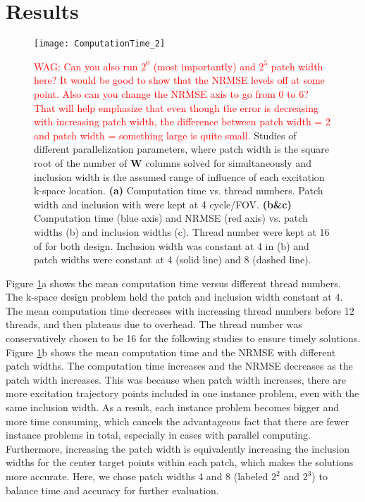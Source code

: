 \section*{Results}

\begin{figure}
	\centering
	\texttt{[image: ComputationTime\_2]}
	\caption{\textcolor{red}{WAG: Can you also run $2^0$ (most importantly) and $2^5$ patch width here? It would be good to show that the NRMSE levels off at some point. Also can you change the NRMSE axis to go from 0 to 6? That will help emphasize that even though the error is decreasing with increasing patch width, 
	the difference between patch width = 2 and patch width = something large is quite small. }
	Studies of different parallelization parameters, where patch width is the square root of the number of $\mathbf{W}$ columns solved for simultaneously and inclusion width is the assumed range of influence of each excitation k-space location. \textbf{(a)} Computation time vs. thread numbers. Patch width and inclusion with were kept at 4 cycle/FOV. \textbf{(b\&c)} Computation time (blue axis) and NRMSE (red axis) vs. patch widths (b) and inclusion widths (c). Thread number were kept at 16 of for both design. Inclusion width was constant at 4 in (b) and patch widths were constant at 4 (solid line) and 8 (dashed line).}
	\label{fig:ComputationTime}
\end{figure}
Figure \ref{fig:ComputationTime}a shows the mean computation time versus different thread numbers. The k-space design problem held the patch and inclusion width constant at 4. The mean computation time decreases with increasing thread numbers before 12 threads, and then plateaus due to overhead. The thread number was conservatively chosen to be 16 for the following studies to ensure timely solutions. 
Figure \ref{fig:ComputationTime}b shows the mean computation time and the NRMSE with different patch widths. The computation time increases and the NRMSE decreases as the patch width increases. This was because when patch width increases, there are more excitation trajectory points included in one instance problem, even with the same inclusion width. As a result, each instance problem becomes bigger and more time consuming, which cancels the advantageous fact that there are fewer instance problems in total, especially in cases with parallel computing. Furthermore, increasing the patch width is equivalently increasing the inclusion widths for the center target points within each patch, which makes the solutions more accurate. Here, we chose patch widths 4 and 8 (labeled $2^2$ and $2^3$) to balance time and accuracy for further evaluation.
